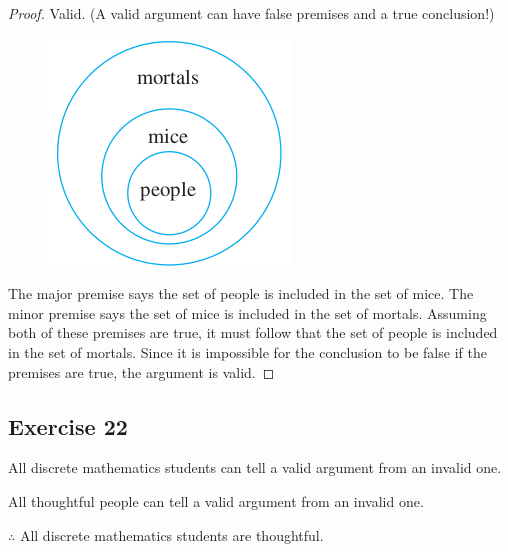 \documentclass[14pt]{extarticle}
\begin{document}
\begin{proof}
Valid. (A valid argument can have false premises and a
true conclusion!)
\begin{figure}[ht!]
\centering
\includegraphics[scale=0.5]{../images/3.4.21.png}
\end{figure}

The major premise says the set of people is included in the set of mice. The minor premise says the set of mice is included in the set of mortals. Assuming both of these premises are true, it must follow that the set of people is included in the set of mortals. Since it is impossible for the conclusion to be false if the premises are true, the argument is valid.
\end{proof}

\subsection{Exercise 22}
All discrete mathematics students can tell a valid argument from an invalid one.

All thoughtful people can tell a valid argument from an invalid one.

$\therefore$ All discrete mathematics students are thoughtful.
\end{document}
